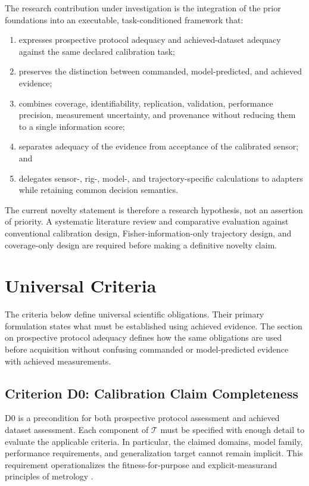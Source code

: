 \documentclass[11pt,a4paper]{article}
\begin{document}
The research contribution under investigation is the integration of the prior
foundations into an executable, task-conditioned framework that:
\begin{enumerate}
    \item expresses prospective protocol adequacy and achieved-dataset
        adequacy against the same declared calibration task;
    \item preserves the distinction between commanded, model-predicted, and
        achieved evidence;
    \item combines coverage, identifiability, replication, validation,
        performance precision, measurement uncertainty, and provenance without
        reducing them to a single information score;
    \item separates adequacy of the evidence from acceptance of the calibrated
        sensor; and
    \item delegates sensor-, rig-, model-, and trajectory-specific calculations
        to adapters while retaining common decision semantics.
\end{enumerate}

The current novelty statement is therefore a research hypothesis, not an
assertion of priority. A systematic literature review and comparative
evaluation against conventional calibration design, Fisher-information-only
trajectory design, and coverage-only design are required before making a
definitive novelty claim.


\section{Universal Criteria}

The criteria below define universal scientific obligations. Their primary
formulation states what must be established using achieved evidence. The
section on prospective protocol adequacy defines how the same obligations are
used before acquisition without confusing commanded or model-predicted
evidence with achieved measurements.

\subsection{Criterion D0: Calibration Claim Completeness}

D0 is a precondition for both prospective protocol assessment and achieved
dataset assessment. Each component of $\mathcal{T}$ must be specified with
enough detail to evaluate the applicable criteria. In particular, the claimed
domains, model family, performance requirements, and generalization target
cannot remain implicit. This requirement operationalizes the
fitness-for-purpose and explicit-measurand principles of metrology
\cite{jcgm100,jcgm200}.
\end{document}
